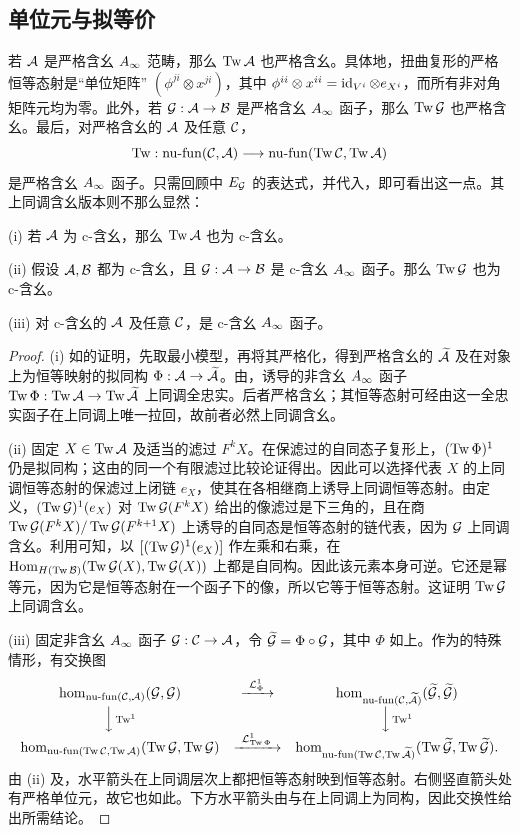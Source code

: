 \subsection{单位元与拟等价}\label{sec:3n}
若 $\mathcal A$ 是严格含幺 $A_\infty$ 范畴，那么 $\operatorname{Tw}\mathcal A$ 也严格含幺。具体地，扭曲复形的严格恒等态射是“单位矩阵” $(\phi^{ji}\otimes x^{ji})$，其中 $\phi^{ii}\otimes x^{ii}=\operatorname{id}_{V^i}\otimes e_{X^i}$，而所有非对角矩阵元均为零。此外，若 $\mathcal G:\mathcal A\to\mathcal B$ 是严格含幺 $A_\infty$ 函子，那么 $\operatorname{Tw}\mathcal G$ 也严格含幺。最后，对严格含幺的 $\mathcal A$ 及任意 $\mathcal C$，
\begin{equation}\label{eq:3.26}
\operatorname{Tw}:\operatorname{nu\text{-}fun}(\mathcal C,\mathcal A)\longrightarrow\operatorname{nu\text{-}fun}(\operatorname{Tw}\mathcal C,\operatorname{Tw}\mathcal A)
\end{equation}
是严格含幺 $A_\infty$ 函子。只需回顾中 $E_{\mathcal G}$ 的表达式，并代入，即可看出这一点。其上同调含幺版本则不那么显然：
\begin{lemma}\label{st:3.24}
\textup{(i)} 若 $\mathcal A$ 为 c-含幺，那么 $\operatorname{Tw}\mathcal A$ 也为 c-含幺。

\textup{(ii)} 假设 $\mathcal A,\mathcal B$ 都为 c-含幺，且 $\mathcal G:\mathcal A\to\mathcal B$ 是 c-含幺 $A_\infty$ 函子。那么 $\operatorname{Tw}\mathcal G$ 也为 c-含幺。

\textup{(iii)} 对 c-含幺的 $\mathcal A$ 及任意 $\mathcal C$，是 c-含幺 $A_\infty$ 函子。
\end{lemma}
\begin{proof}
(i) 如的证明，先取最小模型，再将其严格化，得到严格含幺的 $\widetilde{\mathcal A}$ 及在对象上为恒等映射的拟同构 $\Phi:\mathcal A\to\widetilde{\mathcal A}$。由，诱导的非含幺 $A_\infty$ 函子 $\operatorname{Tw}\Phi:\operatorname{Tw}\mathcal A\to\operatorname{Tw}\widetilde{\mathcal A}$ 上同调全忠实。后者严格含幺；其恒等态射可经由这一全忠实函子在上同调上唯一拉回，故前者必然上同调含幺。

(ii) 固定 $X\in\operatorname{Tw}\mathcal A$ 及适当的滤过 $F^kX$。在保滤过的自同态子复形上，$(\operatorname{Tw}\Phi)^1$ 仍是拟同构；这由的同一个有限滤过比较论证得出。因此可以选择代表 $X$ 的上同调恒等态射的保滤过上闭链 $e_X$，使其在各相继商上诱导上同调恒等态射。由定义，$(\operatorname{Tw}\mathcal G)^1(e_X)$ 对 $\operatorname{Tw}\mathcal G(F^kX)$ 给出的像滤过是下三角的，且在商 $\operatorname{Tw}\mathcal G(F^kX)/\operatorname{Tw}\mathcal G(F^{k+1}X)$ 上诱导的自同态是恒等态射的链代表，因为 $\mathcal G$ 上同调含幺。利用可知，以 $[(\operatorname{Tw}\mathcal G)^1(e_X)]$ 作左乘和右乘，在 $\operatorname{Hom}_{H(\operatorname{Tw}\mathcal B)}(\operatorname{Tw}\mathcal G(X),\operatorname{Tw}\mathcal G(X))$ 上都是自同构。因此该元素本身可逆。它还是幂等元，因为它是恒等态射在一个函子下的像，所以它等于恒等态射。这证明 $\operatorname{Tw}\mathcal G$ 上同调含幺。

(iii) 固定非含幺 $A_\infty$ 函子 $\mathcal G:\mathcal C\to\mathcal A$，令 $\widetilde{\mathcal G}=\Phi\circ\mathcal G$，其中 $\Phi$ 如上。作为的特殊情形，有交换图
\[
\begin{array}{ccc}
\hom_{\nufun(\C,\A)}(\G,\G)&\xrightarrow{\ \LG^1_{\Phi}\ }&\hom_{\nufun(\C,\widetilde{\A})}(\widetilde{\G},\widetilde{\G})\\[3pt]
\Big\downarrow\scriptstyle\Tw^1&&\Big\downarrow\scriptstyle\Tw^1\\[3pt]
\hom_{\nufun(\Tw\C,\Tw\A)}(\Tw\G,\Tw\G)&\xrightarrow{\ \LG^1_{\Tw\Phi}\ }&\hom_{\nufun(\Tw\C,\Tw\widetilde{\A})}(\Tw\widetilde{\G},\Tw\widetilde{\G}).
\end{array}
\]
由 (ii) 及，水平箭头在上同调层次上都把恒等态射映到恒等态射。右侧竖直箭头处有严格单位元，故它也如此。下方水平箭头由与在上同调上为同构，因此交换性给出所需结论。
\end{proof}

